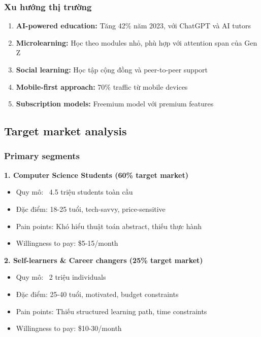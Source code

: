 \subsubsection{Xu hướng thị trường}

\begin{enumerate}
\item \textbf{AI-powered education:} Tăng 42\% năm 2023, với ChatGPT và AI tutors
\item \textbf{Microlearning:} Học theo modules nhỏ, phù hợp với attention span của Gen Z
\item \textbf{Social learning:} Học tập cộng đồng và peer-to-peer support
\item \textbf{Mobile-first approach:} 70\% traffic từ mobile devices
\item \textbf{Subscription models:} Freemium model với premium features
\end{enumerate}

\subsection{Target market analysis}
\label{subsec:target-market}

\subsubsection{Primary segments}

\textbf{1. Computer Science Students (60\% target market)}
\begin{itemize}
\item Quy mô: ~4.5 triệu students toàn cầu
\item Đặc điểm: 18-25 tuổi, tech-savvy, price-sensitive
\item Pain points: Khó hiểu thuật toán abstract, thiếu thực hành
\item Willingness to pay: \$5-15/month
\end{itemize}

\textbf{2. Self-learners \& Career changers (25\% target market)}
\begin{itemize}
\item Quy mô: ~2 triệu individuals
\item Đặc điểm: 25-40 tuổi, motivated, budget constraints
\item Pain points: Thiếu structured learning path, time constraints
\item Willingness to pay: \$10-30/month
\end{itemize}

